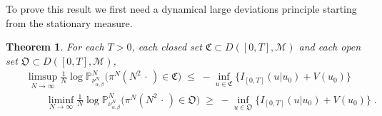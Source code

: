 \documentclass[reqno]{amsart}
\newtheorem{theorem}{Theorem}[section]
\begin{document}
To prove this result we first need a dynamical large deviations
principle starting from the stationary measure. 

\begin{theorem}
\label{s10}
For each $T>0$, each closed set ${{\mathfrak C}} \subset D([0,T], {{\mathscr M}})$ and each open set ${{\mathfrak O}} \subset D([0,T], {{\mathscr M}})$,
\begin{eqnarray*}
&& 
\limsup_{N\to\infty} \frac 1N \log {{\mathbb P}}^N_{\nu^N_{\alpha, \beta}} 
\big( \pi^N (N^2 \,\cdot\,)\in {{\mathfrak C}}\big)
\;\leq\; - \inf_{u \in {{\mathfrak C}}} \big\{ I_{[0,T]} (u | u_0)  + V(u_0) \big\}
\\
&& \qquad 
\liminf_{N\to\infty} \frac 1N \log {{\mathbb P}}^N_{\nu^N_{\alpha, \beta}} 
\big( \pi^N (N^2 \,\cdot\,) \in {{\mathfrak O}} \big) \;\geq\; -  \inf_{u \in {{\mathfrak O}}} 
\big\{ I_{[0,T]} (u | u_0)  + V(u_0) \big\}\; . 
\end{eqnarray*}
\end{theorem}
\end{document}
